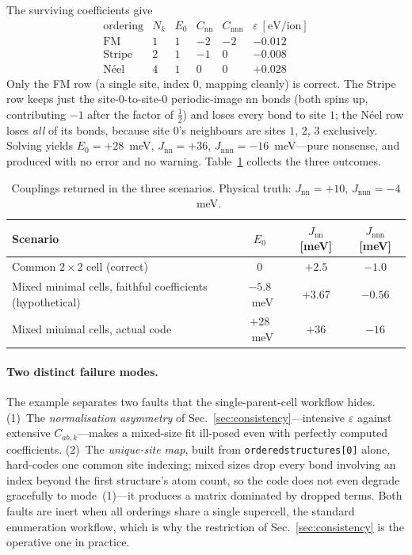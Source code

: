 \documentclass[11pt]{article}
\newcommand{\code}[1]{\texttt{\def\_{\textunderscore\allowbreak}#1}}
\begin{document}
The surviving coefficients give
\begin{equation*}
\begin{array}{l|c|ccc|c}
\text{ordering} & N_k & E_0 & C_{\mathrm{nn}} & C_{\mathrm{nnn}} & \varepsilon~[\mathrm{eV/ion}]\\\hline
\text{FM}     & 1 & 1 & -2 & -2 & -0.012\\
\text{Stripe} & 2 & 1 & -1 &  0 & -0.008\\
\text{N\'eel} & 4 & 1 &  0 &  0 & +0.028
\end{array}
\end{equation*}
Only the FM row (a single site, index $0$, mapping cleanly) is correct. The
Stripe row keeps just the site-$0$-to-site-$0$ periodic-image nn bonds (both
spins up, contributing $-1$ after the factor of $\tfrac12$) and loses every bond
to site $1$; the N\'eel row loses \emph{all} of its bonds, because site $0$'s
neighbours are sites $1$, $2$, $3$ exclusively. Solving yields $E_0=+28$~meV,
$J_{\mathrm{nn}}=+36$, $J_{\mathrm{nnn}}=-16$~meV---pure nonsense, and produced
with no error and no warning. Table~\ref{tab:threecases} collects the three
outcomes.

\begin{table}[h]
\centering
\caption{Couplings returned in the three scenarios. Physical truth:
$J_{\mathrm{nn}}=+10$, $J_{\mathrm{nnn}}=-4$~meV.}
\label{tab:threecases}
\begin{tabularx}{\textwidth}{@{}X c c c@{}}
\toprule
Scenario & $E_0$ & $J_{\mathrm{nn}}$ [meV] & $J_{\mathrm{nnn}}$ [meV] \\
\midrule
Common $2\times2$ cell (correct)                       & $0$        & $+2.5$  & $-1.0$  \\
Mixed minimal cells, faithful coefficients (hypothetical) & $-5.8$~meV & $+3.67$ & $-0.56$ \\
Mixed minimal cells, actual code                        & $+28$~meV  & $+36$   & $-16$   \\
\bottomrule
\end{tabularx}
\end{table}

\paragraph{Two distinct failure modes.} The example separates two faults that the
single-parent-cell workflow hides. (1)~The \emph{normalisation asymmetry} of
Sec.~\ref{sec:consistency}---intensive $\varepsilon$ against extensive
$C_{ab,k}$---makes a mixed-size fit ill-posed even with perfectly computed
coefficients. (2)~The \emph{unique-site map}, built from
\code{ordered\_structures[0]} alone, hard-codes one common site indexing; mixed
sizes drop every bond involving an index beyond the first structure's atom count,
so the code does not even degrade gracefully to mode~(1)---it produces a matrix
dominated by dropped terms. Both faults are inert when all orderings share a
single supercell, the standard enumeration workflow, which is why the restriction
of Sec.~\ref{sec:consistency} is the operative one in practice.
\end{document}
